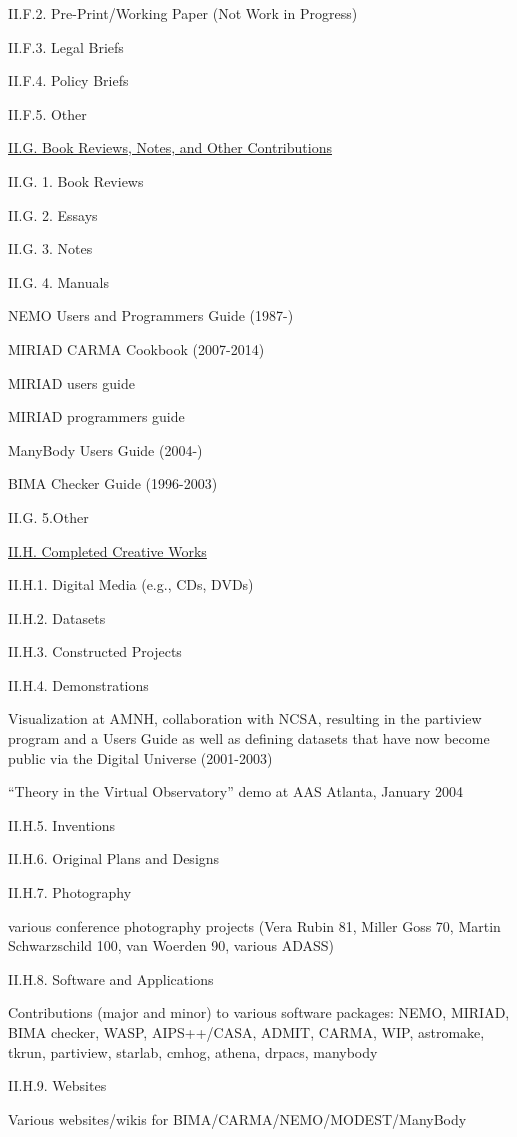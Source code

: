 \documentclass[11pt,letterpaper]{article}
\begin{document}
II.F.2. Pre-Print/Working Paper (Not Work in Progress)

II.F.3. Legal Briefs

II.F.4. Policy Briefs

II.F.5. Other


\underline{II.G. Book Reviews, Notes, and Other Contributions}

II.G. 1. Book Reviews


II.G. 2. Essays

II.G. 3. Notes

II.G. 4. Manuals

NEMO Users and Programmers Guide (1987-)

MIRIAD CARMA Cookbook (2007-2014)

MIRIAD users guide

MIRIAD programmers guide

ManyBody Users Guide (2004-)

BIMA Checker Guide (1996-2003)


II.G. 5.Other


\underline{II.H. Completed Creative Works}

II.H.1. Digital Media (e.g., CDs, DVDs)

II.H.2. Datasets

II.H.3. Constructed Projects

II.H.4. Demonstrations

Visualization at AMNH, collaboration with NCSA, resulting in the
partiview program and a Users Guide as well as defining datasets that
have now become public via the Digital Universe (2001-2003)

``Theory in the Virtual Observatory'' demo at AAS  Atlanta, January 2004
                
II.H.5. Inventions

II.H.6. Original Plans and Designs

II.H.7. Photography

various conference photography projects (Vera Rubin 81, Miller Goss 70, Martin Schwarzschild 100, van Woerden 90, various ADASS)

II.H.8. Software and Applications

Contributions (major and minor) to various software packages: NEMO,
MIRIAD, BIMA checker, WASP, AIPS++/CASA, ADMIT, CARMA, WIP, astromake,
tkrun, partiview, starlab, cmhog, athena, drpacs, manybody


II.H.9. Websites

Various websites/wikis for BIMA/CARMA/NEMO/MODEST/ManyBody
\end{document}
